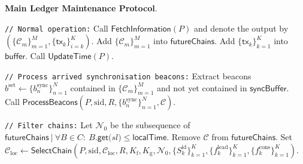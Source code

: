 \bigbreak
\bigbreak
\noindent
{}
\textbf{Main Ledger Maintenance Protocol}.\label{apndx:main-ledger-protocol}
\begin{protocol}
    \caption{$\textsf{LedgerMaintenance}(P, \text{sid}, \mathcal{C}_{\text{loc}}, R, K_{\text{f}}, K_{\text{g}}, \{S_k^{\text{id}}\}_{k=1}^K, \{f^{\text{lead}}_k\}_{k=1}^K, \{f^{\text{cons}}_k\}_{k=1}^K)$}
    \begin{algorithmic}[1]

        \noindent
        \lstinline|// Normal operation:|
        \State Call $\textsf{FetchInformation}(P)$ and denote the output by $(\{\mathcal{C}_m\}_{m=1}^M, \{\textsf{tx}_k\}_{i=k}^K)$.
        \State Add $\{\mathcal{C}_m\}_{m=1}^M$ into $\textsf{futureChains}$.
        \State Add $\{\textsf{tx}_k\}_{k=1}^K$ into $\textsf{buffer}$.
        \State Call $\textsf{UpdateTime}(P)$.

        \noindent
        \lstinline|// Process arrived synchronisation beacons:|
        \State Extract beacons $b^{\text{set}} \leftarrow \{b^{\text{sync}}_n\}_{n=1}^N$ contained in $\{\mathcal{C}_m\}_{m=1}^M$ and not yet contained in $\textsf{syncBuffer}$.
        \State Call $\textsf{ProcessBeacons}(P, \text{sid}, R, \{b^{\text{sync}}_n\}_{n=1}^N, \mathcal{C})$.

        \noindent
        \lstinline|// Filter chains:|
        \State Let $\mathcal{N}_0$ be the subsequence of $\textsf{futureChains}\ |\ \forall B \in C:\ B{\textsf{.get(} sl \textsf{)}} \leq \textsf{localTime}$.
            \State Remove $\mathcal{C}$ from $\textsf{futureChains}$.
        \EndFor
        \State Set $\mathcal{C}_{\text{loc}} \leftarrow \textsf{SelectChain}(P, \text{sid}, \mathcal{C}_{\text{loc}}, R, K_{\text{f}}, K_{\text{g}}, \mathcal{N}_0, \{S_k^{\text{id}}\}_{k=1}^K, \{f^{\text{lead}}_k\}_{k=1}^K, \{f^{\text{cons}}_k\}_{k=1}^K)$.


\end{algorithmic}
\end{protocol}
